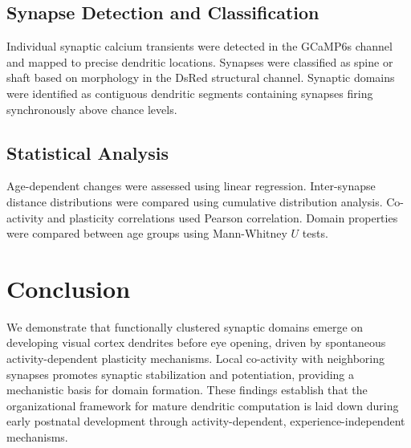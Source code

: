 \documentclass[11pt]{article}
\begin{document}
\subsection{Synapse Detection and Classification}

Individual synaptic calcium transients were detected in the GCaMP6s channel and mapped to precise dendritic locations. Synapses were classified as spine or shaft based on morphology in the DsRed structural channel. Synaptic domains were identified as contiguous dendritic segments containing synapses firing synchronously above chance levels.

\subsection{Statistical Analysis}

Age-dependent changes were assessed using linear regression. Inter-synapse distance distributions were compared using cumulative distribution analysis. Co-activity and plasticity correlations used Pearson correlation. Domain properties were compared between age groups using Mann-Whitney $U$ tests.

\section{Conclusion}

We demonstrate that functionally clustered synaptic domains emerge on developing visual cortex dendrites before eye opening, driven by spontaneous activity-dependent plasticity mechanisms. Local co-activity with neighboring synapses promotes synaptic stabilization and potentiation, providing a mechanistic basis for domain formation. These findings establish that the organizational framework for mature dendritic computation is laid down during early postnatal development through activity-dependent, experience-independent mechanisms.



\end{document}
